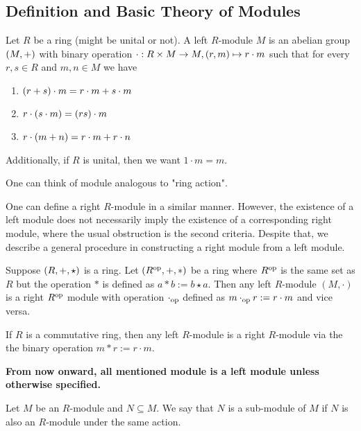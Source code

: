 \subsection{Definition and Basic Theory of Modules}
\begin{defn} [Module]
    Let $R$ be a ring (might be unital or not). A left $R$-module $M$ is an abelian group $\left(M,+\right)$ with binary operation $\cdot:R\times M\to M, \left(r,m\right)\mapsto r\cdot m$ such that for every $r,s\in R$ and $m,n\in M$ we have
    \begin{enumerate}
        \item $\left(r+s\right)\cdot m = r\cdot m + s\cdot m$
        \item $r\cdot \left(s\cdot m\right) = \left(rs\right)\cdot m$
        \item $r\cdot \left(m+n\right) = r\cdot m + r\cdot n$
    \end{enumerate}
    Additionally, if $R$ is unital, then we want $1\cdot m = m$.
\end{defn}
One can think of module analogous to "ring action". 

\medskip

\begin{re}
    One can define a right $R$-module in a similar manner. However, the existence of a left module does not necessarily imply the existence of a corresponding right module, where the usual obstruction is the second criteria. Despite that, we describe a general procedure in constructing a right module from a left module. 

    Suppose $\left(R,+,\star\right)$ is a ring. Let $(R^{\operatorname{op}},+,*)$ be a ring where $R^{\operatorname{op}}$ is the same set as $R$ but the operation $*$ is defined as $a*b := b\star a$. Then any left $R$-module $(M,\cdot)$ is a right $R^{\operatorname{op}}$ module with operation $\cdot_{\operatorname{op}}$ defined as $m\cdot_{\operatorname{op}} r:= r\cdot m$ and vice versa.
\end{re}

\medskip

\begin{re}
    If $R$ is a commutative ring, then any left $R$-module is a right $R$-module via the the binary operation $m*r := r\cdot m$.
\end{re}

\medskip

\textbf{From now onward, all mentioned module is a left module unless otherwise specified.}

\medskip

\begin{defn} 
    Let $M$ be an $R$-module and $N\subseteq M$. We say that $N$ is a sub-module of $M$ if $N$ is also an $R$-module under the same action.
\end{defn}

